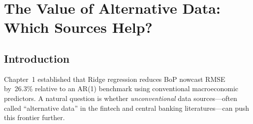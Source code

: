 \chapter{The Value of Alternative Data:\\Which Sources Help?}
\label{ch:alternative_data}

\begin{abstract}
This chapter conducts a structured ablation study to quantify the incremental forecasting value of alternative data for BoP nowcasting.  Using Ridge regression (the best-performing model from Chapter~1) and monthly goods trade balance data for France (2008--2022), we progressively incorporate four categories of alternative data---trade-activity proxies, financial-flow indicators, text/sentiment data, and satellite/geospatial proxies---into a baseline model that uses only conventional macroeconomic predictors.  The full model incorporating all categories yields a~6.5\% RMSE reduction over the baseline (Diebold--Mariano $p = 0.059$; Giacomini--White $p = 0.126$), with a block-bootstrap 95\% confidence interval spanning zero ($[-12.8, +0.6]$\%).  SHAP decomposition reveals that text/sentiment data (ECB FinBERT, Banque de France BCI) provide the largest marginal contribution (19.8\% of total SHAP importance), followed by trade-activity proxies (8.2\%), financial indicators (6.5\%), and satellite data (4.8\%).  A cost--benefit analysis shows that the text/sentiment category offers the highest signal-per-complexity ratio, while satellite data provide modest but complementary information during supply-chain disruptions.
\end{abstract}


\section{Introduction}
\label{sec:ch2_intro}

Chapter~1 established that Ridge regression reduces BoP nowcast RMSE by~26.3\% relative to an AR(1) benchmark using conventional macroeconomic predictors.  A natural question is whether \emph{unconventional} data sources---often called ``alternative data'' in the fintech and central banking literatures---can push this frontier further.


